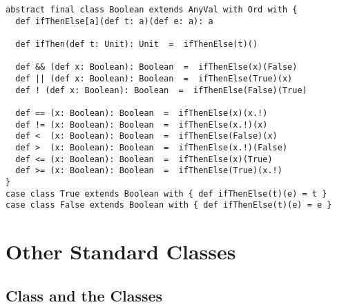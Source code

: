 \documentclass[11pt]{report}
\begin{document}
\begin{itemize}
\begin{verbatim}
abstract final class Boolean extends AnyVal with Ord with {
  def ifThenElse[a](def t: a)(def e: a): a

  def ifThen(def t: Unit): Unit  =  ifThenElse(t)()

  def && (def x: Boolean): Boolean  =  ifThenElse(x)(False)
  def || (def x: Boolean): Boolean  =  ifThenElse(True)(x)
  def ! (def x: Boolean): Boolean  =  ifThenElse(False)(True)

  def == (x: Boolean): Boolean  =  ifThenElse(x)(x.!)
  def != (x: Boolean): Boolean  =  ifThenElse(x.!)(x)
  def <  (x: Boolean): Boolean  =  ifThenElse(False)(x)
  def >  (x: Boolean): Boolean  =  ifThenElse(x.!)(False)
  def <= (x: Boolean): Boolean  =  ifThenElse(x)(True)
  def >= (x: Boolean): Boolean  =  ifThenElse(True)(x.!)
}
case class True extends Boolean with { def ifThenElse(t)(e) = t }
case class False extends Boolean with { def ifThenElse(t)(e) = e }
\end{verbatim}


\section{Other Standard Classes}

\subsection{Class  and the  Classes}
\label{sec:cls-tuple}


\end{itemize}
\end{document}
